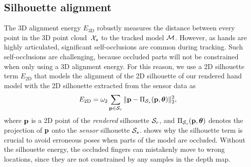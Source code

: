 


\subsection*{Silhouette alignment}
The 3D alignment energy $E_{\text{3D}}$ robustly measures the distance between every point in the 3D point cloud~$\mathcal{X}_{s}$ to the tracked model $\mathcal{M}$. However, as hands are highly articulated, significant self-occlusions are common during tracking. Such self-occlusions are challenging, because occluded parts will not be constrained when only using a 3D alignment energy. For this reason, we use a 2D silhouette term $E_{\text{2D}}$ that models the  alignment of the 2D silhouette of our rendered hand model with the 2D silhouette extracted from the sensor data as 
%
%
\begin{equation}
    E_{\text{2D}} = \omega_2 \sum_{\mathbf{p} \in \mathcal{S}_{r}} \| \mathbf{p} - \Pi_{\mathcal{S}_{s}}(\mathbf{p},\boldsymbol{\theta}) \|_2^2,
\label{eq:align2d}
\end{equation}
%
where $\mathbf{p}$ is a 2D point of the \emph{rendered} silhouette $\mathcal{S}_{r}$, and $\Pi_{\mathcal{S}_{s}}(\mathbf{p},\boldsymbol{\theta})$ denotes the projection of $\mathbf{p}$ onto the \emph{sensor} silhouette $\mathcal{S}_{s}$.
%
 shows why the silhouette term is crucial to avoid erroneous poses when parts of the model are occluded. 
Without the silhouette energy, the occluded fingers can mistakenly move to wrong locations, since they are not constrained by any samples in the depth map.







